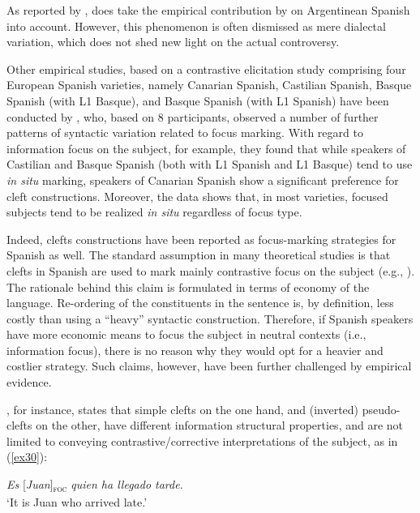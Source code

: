 As reported by \textcite{garcia2018introduction}, \textcite{zubizarreta2016nuclear} does take the empirical contribution by \textcite{gabriel2010focus} on Argentinean Spanish into account. However, this phenomenon is often dismissed as mere dialectal variation, which does not shed new light on the actual controversy.

Other empirical studies, based on a contrastive elicitation study comprising four European Spanish varieties, namely Canarian Spanish, Castilian Spanish, Basque Spanish (with L1 Basque), and Basque Spanish (with L1 Spanish) have been conducted by \textcite{del2018language}, who, based on 8 participants, observed a number of further patterns of syntactic variation related to focus marking. With regard to information focus on the subject, for example, they found that while speakers of Castilian and Basque Spanish (both with L1 Spanish and L1 Basque) tend to use \textit{in situ} marking, speakers of Canarian Spanish show a significant preference for cleft constructions. Moreover, the  data  shows that, in most  varieties, focused subjects tend to be realized \textit{in situ} regardless of focus type. 

Indeed, clefts constructions have been reported as focus-marking strategies for Spanish as well. The standard assumption in many theoretical studies is that clefts in Spanish are used to mark mainly contrastive focus on the subject (e.g., \cite{lambrecht1996information}). The rationale behind this claim is formulated in terms of economy of the language. Re-ordering of the constituents in the sentence is, by definition, less costly than using a “heavy” syntactic construction. Therefore, if Spanish speakers have more economic means to focus the subject in neutral contexts (i.e., information focus), there is no reason why they would opt for a heavier and costlier strategy. Such claims, however, have been further challenged by empirical evidence.

\textcite{cabrera1999funciones}, for instance, states that simple clefts on the one hand, and (inverted) pseudo-clefts on the other, have different information structural properties, and are not limited to conveying contrastive/corrective interpretations of the subject, as in (\ref{ex30}):

\ea \label{ex30}
\textit{Es} {[\textit{Juan}]\textsubscript{\textsc{foc}}} \normalsize \textit{quien ha llegado tarde}.\\
`It is Juan who arrived late.' \hfill \parencite[4247]{cabrera1999funciones}  
\z


